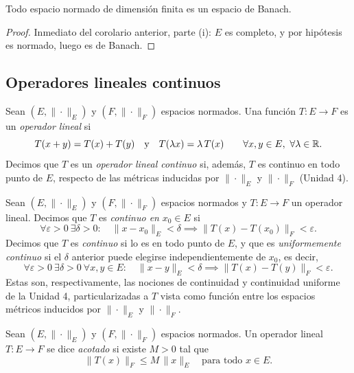 \begin{cor}
Todo espacio normado de dimensión finita es un espacio de Banach.
\end{cor}

\begin{proof}
Inmediato del corolario anterior, parte (i): $E$ es completo, y por
hipótesis es normado, luego es de Banach.
\end{proof}

\subsection{Operadores lineales continuos}

\begin{defi}
Sean $(E,\|\cdot\|_E)$ y $(F,\|\cdot\|_F)$ espacios normados. Una
función $T:E\to F$ es un \emph{operador lineal} si
\[
T(x+y)=T(x)+T(y) \quad \text{y} \quad T(\lambda x)=\lambda\,T(x)
\qquad \forall x,y\in E,\ \forall \lambda\in\mathbb{R}.
\]
Decimos que $T$ es un \emph{operador lineal continuo} si, además, $T$
es continuo en todo punto de $E$, respecto de las métricas inducidas
por $\|\cdot\|_E$ y $\|\cdot\|_F$ (Unidad 4).
\end{defi}

\begin{defi}
Sean $(E,\|\cdot\|_E)$ y $(F,\|\cdot\|_F)$ espacios normados y
$T:E\to F$ un operador lineal. Decimos que $T$ es \emph{continuo en}
$x_0\in E$ si
\[
\forall \varepsilon>0\ \exists \delta>0 :\quad
\|x-x_0\|_E<\delta \implies \|T(x)-T(x_0)\|_F<\varepsilon.
\]
Decimos que $T$ es \emph{continuo} si lo es en todo punto de $E$, y que
es \emph{uniformemente continuo} si el $\delta$ anterior puede
elegirse independientemente de $x_0$, es decir,
\[
\forall \varepsilon>0\ \exists \delta>0\ \forall x,y\in E:\quad
\|x-y\|_E<\delta \implies \|T(x)-T(y)\|_F<\varepsilon.
\]
Estas son, respectivamente, las nociones de continuidad y continuidad
uniforme de la Unidad 4, particularizadas a $T$ vista como función
entre los espacios métricos inducidos por $\|\cdot\|_E$ y
$\|\cdot\|_F$.
\end{defi}

\begin{defi}
Sean $(E,\|\cdot\|_E)$ y $(F,\|\cdot\|_F)$ espacios normados. Un
operador lineal $T:E\to F$ se dice \emph{acotado} si existe $M>0$ tal
que
\[
\|T(x)\|_F \le M\,\|x\|_E \quad \text{para todo } x\in E.
\]
\end{defi}

